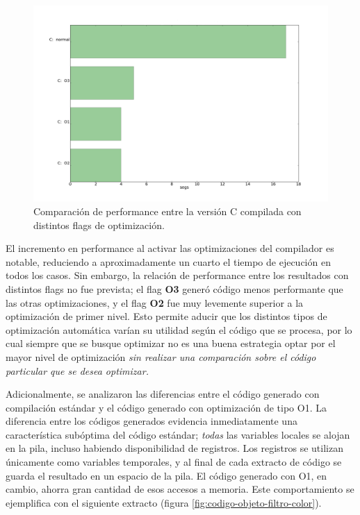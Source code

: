 \begin{figure}[H]
\begin{center}
  \includegraphics[scale=0.35]{secciones/filtro_color/graficos/C_normal_O1_O2_O3.png}
\end{center}
\caption{Comparación de performance entre la versión C compilada con distintos flags de optimización.}
\label{fig:filtro-color-C-vs-Os}
\end{figure}

El incremento en performance al activar las optimizaciones del compilador es notable, reduciendo a aproximadamente un cuarto el tiempo de ejecución en todos los casos. Sin embargo, la relación de performance entre los resultados con distintos flags no fue prevista; el flag \textbf{O3} generó código menos performante que las otras optimizaciones, y el flag \textbf{O2} fue muy levemente superior a la optimización de primer nivel. Esto permite aducir que los distintos tipos de optimización automática varían su utilidad según el código que se procesa, por lo cual siempre que se busque optimizar no es una buena estrategia optar por el mayor nivel de optimización \emph{sin realizar una comparación sobre el código particular que se desea optimizar.}

Adicionalmente, se analizaron las diferencias entre el código generado con compilación estándar y el código generado con optimización de tipo O1. La diferencia entre los códigos generados evidencia inmediatamente una característica subóptima del código estándar; \emph{todas} las variables locales se alojan en la pila, incluso habiendo disponibilidad de registros. Los registros se utilizan únicamente como variables temporales, y al final de cada extracto de código se guarda el resultado en un espacio de la pila. El código generado con O1, en cambio, ahorra gran cantidad de esos accesos a memoria. Este comportamiento se ejemplifica con el siguiente extracto (figura \ref{fig:codigo-objeto-filtro-color}).


